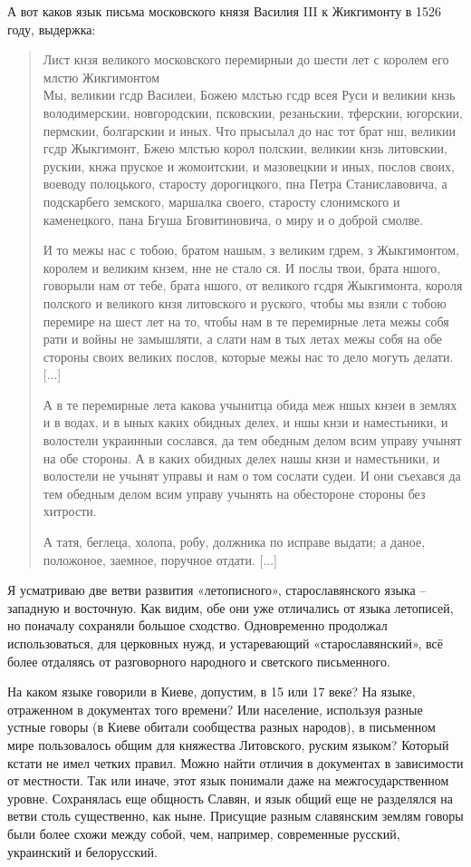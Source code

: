 А вот каков язык письма московского князя Василия III к Жикгимонту в 1526 году, выдержка:

\begin{quotation}
Лист кнзя великого московского перемирныи до шести лет с королем его млстю Жикгимонтом\\

Мы, великии гсдр Василеи, Божею млстью гсдр всея Руси и великии кнзь володимерскии, новгородскии, псковскии, резаньскии, тферскии, югорскии, пермскии, болгарскии и иных. Что прысылал до нас тот брат нш, великии гсдр Жыкгимонт, Бжею млстью корол полскии, великии кнзь литовскии, рускии, кнжа пруское и жомоитскии, и мазовецкии и иных, послов своих, воеводу полоцького, старосту дорогицкого, пна Петра Станиславовича, а подскарбего земского, маршалка своего, старосту слонимского и каменецкого, пана Бгуша Бговитиновича, о миру и о доброй смолве. 

И то межы нас с тобою, братом нашым, з великим гдрем, з Жыкгимонтом, королем и великим кнзем, нне не стало ся. И послы твои, брата ншого, говорыли нам от тебе, брата ншого, от великого гсдря Жыкгимонта, короля полского и великого кнзя литовского и руского, чтобы мы взяли с тобою перемире на шест лет на то, чтобы нам в те перемирные лета межы собя рати и войны не замышляти, а слати нам в тых летах межы собя на обе стороны своих великих послов, которые межы нас то дело могуть делати. [...]

А в те перемирные лета какова учынитца обида меж ншых кнзеи в землях и в водах, и в ыных каких обидных делех, и ншы кнзи и наместьники, и волостели украинныи сослався, да тем обедным делом всим управу учынят на обе сторо­ны. А в каких обидных делех нашы кнзи и наместьники, и волостели не учынят управы и нам о том сослати судеи. И они съехався да тем обедным делом всим управу учынять на обестороне стороны без хитрости.

А татя, беглеца, холопа, робу, должника по исправе выдати; а даное, положоное, заемное, поручное отдати. [...]
\end{quotation}

\newpage

Я усматриваю две ветви развития «летописного», старославянского языка – западную и восточную. Как видим, обе они уже отличались от языка летописей, но поначалу сохраняли большое сходство. Одновременно продолжал использоваться, для церковных нужд, и устаревающий «старославянский», всё более отдаляясь от разговорного народного и светского письменного.

На каком языке говорили в Киеве, допустим, в 15 или 17 веке? На языке, отраженном в документах того времени? Или население, используя разные устные говоры (в Киеве обитали сообщества разных народов), в письменном мире пользовалось общим для княжества Литовского, руским языком? Который кстати не имел четких правил. Можно найти отличия в документах в зависимости от местности. Так или иначе, этот язык понимали даже на межгосударственном уровне. Сохранялась еще общность Славян, и язык общий еще не разделялся на ветви столь существенно, как ныне. Присущие разным славянским землям говоры были более схожи между собой, чем, например, современные русский, украинский и белорусский. 

